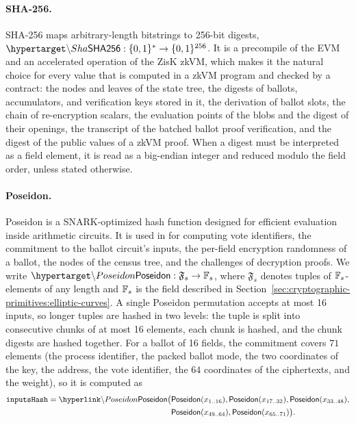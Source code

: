 \paragraph{SHA-256.} SHA-256 maps arbitrary-length bitstrings to 256-bit digests, $\hlset{\Sha} : \{0,1\}^* \rightarrow \{0,1\}^{256}$. It is a precompile of the \ac{EVM} and an accelerated operation of the ZisK \ac{zkVM}, which makes it the natural choice for every value that is computed in a \ac{zkVM} program and checked by a contract: the nodes and leaves of the state tree, the digests of ballots, accumulators, and verification keys stored in it, the derivation of ballot slots, the chain of re-encryption scalars, the evaluation points of the blobs and the digest of their openings, the transcript of the batched ballot proof verification, and the digest of the public values of a \ac{zkVM} proof. When a digest must be interpreted as a field element, it is read as a big-endian integer and reduced modulo the field order, unless stated otherwise.

\paragraph{Poseidon.} Poseidon is a SNARK-optimized hash function designed for efficient evaluation inside arithmetic circuits. It is used in \davinci for computing vote identifiers, the commitment to the ballot circuit's inputs, the per-field encryption randomness of a ballot, the nodes of the census tree, and the challenges of decryption proofs. We write $\hlset{\Poseidon} : \mathfrak{F}_s \rightarrow \F_s$, where $\mathfrak{F}_s$ denotes tuples of $\mathbb{F}_s$-elements of any length and $\mathbb{F}_s$ is the field described in Section~\ref{sec:cryptographic-primitives:elliptic-curves}. A single Poseidon permutation accepts at most 16 inputs, so longer tuples are hashed in two levels: the tuple is split into consecutive chunks of at most 16 elements, each chunk is hashed, and the chunk digests are hashed together. For a ballot of 16 fields, the commitment \ballotinputshash covers $71$ elements (the process identifier, the packed ballot mode, the two coordinates of the key, the address, the vote identifier, the $64$ coordinates of the ciphertexts, and the weight), so it is computed as
\begin{align*}
\ballotinputshash = \hlget{\Poseidon}\bigl(&\Poseidon(x_{1..16}), \Poseidon(x_{17..32}), \Poseidon(x_{33..48}),\\ &\Poseidon(x_{49..64}), \Poseidon(x_{65..71})\bigr).
\end{align*}

